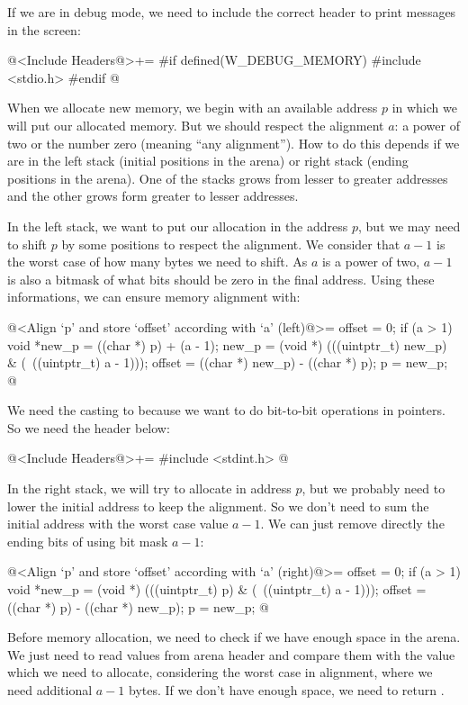 If we are in debug mode, we need to include the correct header to
print messages in the screen:

\iniciocodigo
@<Include Headers@>+=
#if defined(W_DEBUG_MEMORY)
#include <stdio.h>
#endif
@
\fimcodigo


When we allocate new memory, we begin with an available address $p$ in
which we will put our allocated memory. But we should respect the
alignment $a$: a power of two or the number zero (meaning ``any
alignment''). How to do this depends if we are in the left stack
(initial positions in the arena) or right stack (ending positions in
the arena). One of the stacks grows from lesser to greater addresses
and the other grows form greater to lesser addresses.

In the left stack, we want to put our allocation in the address $p$,
but we may need to shift $p$ by some positions to respect the
alignment. We consider that $a-1$ is the worst case of how many bytes
we need to shift. As $a$ is a power of two, $a-1$ is also a bitmask of
what bits should be zero in the final address. Using these
informations, we can ensure memory alignment with:

\iniciocodigo
@<Align `p' and store `offset' according with `a' (left)@>=
offset = 0;
if (a > 1){
  void *new_p = ((char *) p) + (a - 1);
  new_p = (void *) (((uintptr_t) new_p) & (~((uintptr_t) a - 1)));
  offset = ((char *) new_p) - ((char *) p);
  p = new_p;
}
@
\fimcodigo

We need the casting to  because we want to do
bit-to-bit operations in pointers. So we need the header below:

\iniciocodigo
@<Include Headers@>+=
#include <stdint.h>
@
\fimcodigo

In the right stack, we will try to allocate in address $p$, but we
probably need to lower the initial address to keep the alignment. So
we don't need to sum the initial address with the worst case value
$a-1$. We can just remove directly the ending bits of using bit
mask $a-1$:

\iniciocodigo
@<Align `p' and store `offset' according with `a' (right)@>=
offset = 0;
if (a > 1){
  void *new_p = (void *) (((uintptr_t) p) & (~((uintptr_t) a - 1)));
  offset = ((char *) p) - ((char *) new_p);
  p = new_p;
}
@
\fimcodigo


Before memory allocation, we need to check if we have enough space in
the arena. We just need to read values from arena header and compare
them with the value which we need to allocate, considering the worst
case in alignment, where we need additional $a-1$ bytes. If we don't
have enough space, we need to return .

